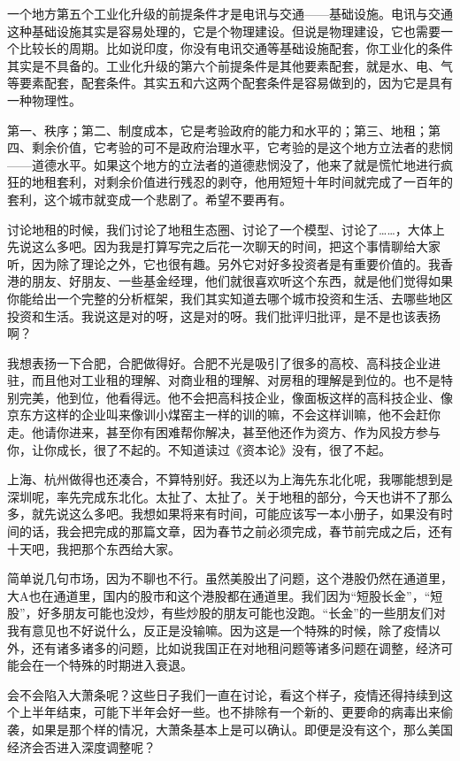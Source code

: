\documentclass[UTF8, 12pt, a4paper]{ctexrep}
\begin{document}
一个地方第五个工业化升级的前提条件才是电讯与交通——基础设施。电讯与交通这种基础设施其实是容易处理的，它是个物理建设。但说是物理建设，它也需要一个比较长的周期。比如说印度，你没有电讯交通等基础设施配套，你工业化的条件其实是不具备的。工业化升级的第六个前提条件是其他要素配套，就是水、电、气等要素配套，配套条件。其实五和六这两个配套条件是容易做到的，因为它是具有一种物理性。

第一、秩序；第二、制度成本，它是考验政府的能力和水平的；第三、地租；第四、剩余价值，它考验的可不是政府治理水平，它考验的是这个地方立法者的悲悯——道德水平。如果这个地方的立法者的道德悲悯没了，他来了就是慌忙地进行疯狂的地租套利，对剩余价值进行残忍的剥夺，他用短短十年时间就完成了一百年的套利，这个城市就变成一个悲剧了。希望不要再有。

讨论地租的时候，我们讨论了地租生态圈、讨论了一个模型、讨论了……，大体上先说这么多吧。因为我是打算写完之后花一次聊天的时间，把这个事情聊给大家听，因为除了理论之外，它也很有趣。另外它对好多投资者是有重要价值的。我香港的朋友、好朋友、一些基金经理，他们就很喜欢听这个东西，就是他们觉得如果你能给出一个完整的分析框架，我们其实知道去哪个城市投资和生活、去哪些地区投资和生活。我说这是对的呀，这是对的呀。我们批评归批评，是不是也该表扬啊？

我想表扬一下合肥，合肥做得好。合肥不光是吸引了很多的高校、高科技企业进驻，而且他对工业租的理解、对商业租的理解、对房租的理解是到位的。也不是特别完美，他到位，他看得远。他不会把高科技企业，像面板这样的高科技企业、像京东方这样的企业叫来像训小煤窑主一样的训的嘛，不会这样训嘛，他不会赶你走。他请你进来，甚至你有困难帮你解决，甚至他还作为资方、作为风投方参与你，让你成长，很了不起的。不知道读过《资本论》没有，很了不起。

上海、杭州做得也还凑合，不算特别好。我还以为上海先东北化呢，我哪能想到是深圳呢，率先完成东北化。太扯了、太扯了。关于地租的部分，今天也讲不了那么多，就先说这么多吧。我想如果将来有时间，可能应该写一本小册子，如果没有时间的话，我会把完成的那篇文章，因为春节之前必须完成，春节前完成之后，还有十天吧，我把那个东西给大家。

简单说几句市场，因为不聊也不行。虽然美股出了问题，这个港股仍然在通道里，大A也在通道里，国内的股市和这个港股都在通道里。我们因为“短股长金”，“短股”，好多朋友可能也没炒，有些炒股的朋友可能也没跑。“长金”的一些朋友们对我有意见也不好说什么，反正是没输嘛。因为这是一个特殊的时候，除了疫情以外，还有诸多诸多的问题，比如说我国正在对地租问题等诸多问题在调整，经济可能会在一个特殊的时期进入衰退。

会不会陷入大萧条呢？这些日子我们一直在讨论，看这个样子，疫情还得持续到这个上半年结束，可能下半年会好一些。也不排除有一个新的、更要命的病毒出来偷袭，如果是那个样的情况，大萧条基本上是可以确认。即便是没有这个，那么美国经济会否进入深度调整呢？
\end{document}
